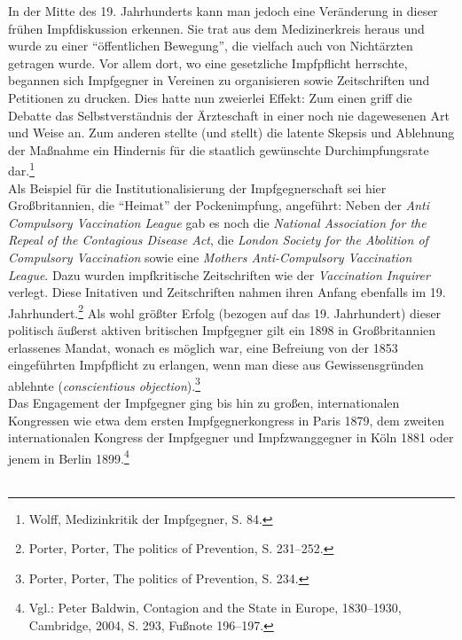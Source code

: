 \documentclass[
    a4paper,
    12pt,
    hyphens,
    chapterprefix=true,
    headheight=33pt,
    footheight=29pt,
    headings=optiontohead, %
]{scrartcl}
\begin{document}
In der Mitte des 19. Jahrhunderts kann man jedoch eine Veränderung in dieser frühen Impfdiskussion erkennen. Sie trat aus dem Medizinerkreis heraus und wurde zu einer "`öffentlichen Bewegung"', die vielfach auch von Nichtärzten getragen wurde. Vor allem dort, wo eine gesetzliche Impfpflicht herrschte, begannen sich Impfgegner in Vereinen zu organisieren sowie Zeitschriften und Petitionen zu drucken. Dies hatte nun zweierlei Effekt: Zum einen griff die Debatte das Selbstverständnis der Ärzteschaft in einer noch nie dagewesenen Art und Weise an. Zum anderen stellte (und stellt) die latente Skepsis und Ablehnung der Maßnahme ein Hindernis für die staatlich gewünschte Durchimpfungsrate dar.\footnote{Wolff, Medizinkritik der Impfgegner, S. 84.}\\
Als Beispiel für die Institutionalisierung der Impfgegnerschaft sei hier Großbritannien, die "`Heimat"' der Pockenimpfung, angeführt: Neben der \textit{Anti Compulsory Vaccination League} gab es noch die \textit{National Association for the Repeal of the Contagious Disease Act}, die \textit{London Society for the Abolition of Compulsory Vaccination} sowie eine \textit{Mothers Anti-Compulsory Vaccination League}. Dazu wurden impfkritische Zeitschriften wie der \textit{Vaccination Inquirer} verlegt. Diese Initativen und Zeitschriften nahmen ihren Anfang ebenfalls im 19. Jahrhundert.\footnote{Porter, Porter, The politics of Prevention, S. 231--252.} Als wohl größter Erfolg (bezogen auf das 19. Jahrhundert) dieser politisch äußerst aktiven britischen Impfgegner gilt ein 1898 in Großbritannien erlassenes Mandat, wonach es möglich war, eine Befreiung von der 1853 eingeführten Impfpflicht zu erlangen, wenn man diese aus Gewissensgründen ablehnte (\textit{conscientious objection}).\footnote{Porter, Porter, The politics of Prevention, S. 234.}\\
Das Engagement der Impfgegner ging bis hin zu großen, internationalen Kongressen wie etwa dem ersten Impfgegnerkongress in Paris 1879, dem zweiten internationalen Kongress der Impfgegner und Impfzwanggegner in Köln 1881 oder jenem in Berlin 1899.\footnote{Vgl.: Peter Baldwin, Contagion and the State in Europe, 1830--1930, Cambridge, 2004, S. 293, Fußnote 196--197.} \\
\\
\end{document}

